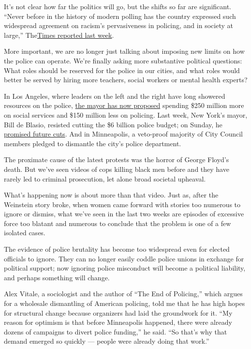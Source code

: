 It's not clear how far the politics will go, but the shifts so far are
significant. ``Never before in the history of modern polling has the
country expressed such widespread agreement on racism's pervasiveness in
policing, and in society at large,''
The\href{https://www.nytimes3xbfgragh.onion/2020/06/05/us/politics/polling-george-floyd-protests-racism.html}{Times
reported last week}.

More important, we are no longer just talking about imposing new limits
on how the police can operate. We're finally asking more substantive
political questions: What roles should be reserved for the police in our
cities, and what roles would better be served by hiring more teachers,
social workers or mental health experts?

In Los Angeles, where leaders on the left and the right have long
showered resources on the police,
\href{https://www.latimes.com/california/story/2020-06-05/eric-garcetti-lapd-budget-cuts-10000-officers-protests}{the
mayor has now proposed} spending \$250 million more on social services
and \$150 million less on policing. Last week, New York's mayor, Bill de
Blasio, resisted cutting the \$6 billion police budget; on Sunday, he
\href{https://www.nytimes3xbfgragh.onion/2020/06/07/nyregion/deblasio-nypd-funding.html}{promised
future cuts}. And in Minneapolis, a veto-proof majority of City Council
members pledged to dismantle the city's police department.

The proximate cause of the latest protests was the horror of George
Floyd's death. But we've seen videos of cops killing black men before
and they have rarely led to criminal prosecution, let alone broad
societal upheaval.

What's happening now is about more than that video. Just as, after the
Weinstein story broke, when women came forward with stories too numerous
to ignore or dismiss, what we've seen in the last two weeks are episodes
of excessive force too blatant and numerous to conclude that the problem
is one of a few isolated cases.

The evidence of police brutality has become too widespread even for
elected officials to ignore. They can no longer easily coddle police
unions in exchange for political support; now ignoring police misconduct
will become a political liability, and perhaps something will change.

Alex Vitale, a sociologist and the author of ``The End of Policing,''
which argues for a wholesale dismantling of American policing, told me
that he has high hopes for structural change because organizers had laid
the groundwork for it. ``My reason for optimism is that before
Minneapolis happened, there were already dozens of campaigns to divert
police funding,'' he said. ``So that's why that demand emerged so
quickly --- people were already doing that work.''


